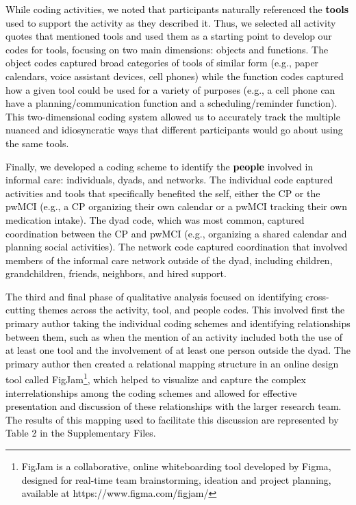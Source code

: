 \documentclass[acmsmall]{acmart}
\begin{document}
\textcolor{black}{While coding activities, we noted that participants naturally referenced the \textbf{tools} used to support the activity \textcolor{black}{as they described it}. Thus, we selected all activity quotes that mentioned tools and used them as a starting point to develop our codes for   tools, focusing on two main dimensions: objects and functions. The object codes captured broad categories of tools of similar form  (e.g., paper calendars, voice assistant devices, cell phones) while the function codes captured how a given tool could be used for a variety of purposes (e.g., a cell phone can have a planning/communication function and a scheduling/reminder function). This two-dimension\textcolor{black}{al} coding system allowed us to accurately track the multiple nuanced and idiosyncratic ways that different participants would go about using the same tools.}

\textcolor{black}{Finally, we developed a coding scheme to identify the \textbf{people} involved in informal care: individuals, dyads, and networks. The individual code captured activities and tools that specifically benefited the self, either the CP or the pwMCI (e.g., a CP organizing their own calendar or a pwMCI tracking their own medication intake). The dyad code, which was most common, captured coordination between the CP and pwMCI (e.g., organizing a shared calendar and planning social activities). The network code captured coordination that involved members of the informal care network outside of the dyad, including children, grandchildren, friends, neighbors, and hired support.}

\textcolor{black}{The third and final phase of qualitative analysis focused on identifying cross-cutting themes across the activity, tool, and people codes. This involved first the primary author taking the individual coding schemes and identifying relationships between them, such as when the mention of an activity included both the use of at least one tool and the involvement of at least one person outside the dyad. The primary author \textcolor{black}{then} created \textcolor{black}{a} relational mapping structure in an online design tool called FigJam\textcolor{black}{\footnote{\textcolor{black}{FigJam is a collaborative, online whiteboarding tool developed by Figma, designed for real-time team brainstorming, ideation and project planning, available at https://www.figma.com/figjam/}}}, which helped to visualize and capture the complex interrelationships among the  coding schemes and allowed for effective presentation and discussion of these relationships  with the larger research team. The results of this mapping used to facilitate this discussion are represented by Table 2 in the Supplementary Files.} 
\end{document}
